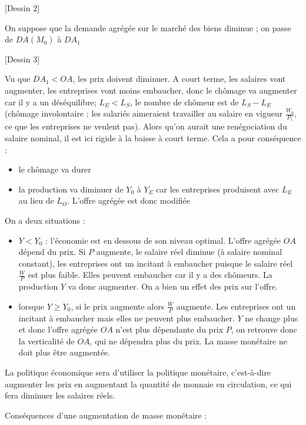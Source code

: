 	[Dessin 2]
	
	On suppose que la demande agrégée sur le marché des biens diminue ; on passe de $DA(M_0)$ à $DA_1$
	
	[Dessin 3]
	
	Vu que $DA_1 < OA$, les prix doivent diminuer. A court terme, les salaires vont augmenter, les entreprises vont moins embaucher, donc le chômage va augmenter car il y a un déséquilibre; $L_E < L_S$, le nombre de chômeur est de $L_S - L_E$ (chômage involontaire ; les salariés aimeraient travailler au salaire en vigueur $\frac{W_0}{P_1}$, ce que les entreprises ne veulent pas). Alors qu'on aurait une renégociation du salaire nominal, il est ici rigide à la baisse à court terme. Cela a pour conséquence :
	
	\begin{itemize}
		\item le chômage va durer
		\item la production va diminuer de $Y_0$ à $Y_E$ car les entreprises produisent avec $L_E$ au lieu de $L_O$. L'offre agrégée est donc modifiée
	\end{itemize}
	
	On a deux situations :
	
	\begin{itemize}
		\item $Y < Y_0$ : l'économie est en dessous de son niveau optimal. L'offre agrégée $OA$ dépend du prix. Si $P$ augmente, le salaire réel diminue (à salaire nominal constant), les entreprises ont un incitant à embaucher puisque le salaire réel $\frac{W}{P}$ est plus faible. Elles peuvent embaucher car il y a des chômeurs. La production $Y$ va donc augmenter. On a bien un effet des prix sur l'offre.
		\item lorsque $Y \geq Y_0$, si le prix augmente alors $\frac{W}{P}$ augmente. Les entreprises ont un incitant à embaucher mais elles ne peuvent plus embaucher. $Y$ ne change plus et donc l'offre agrégée $OA$ n'est plus dépendante du prix $P$, on retrouve donc la verticalité de $OA$, qui ne dépendra plus du prix. La masse monétaire ne doit plus être augmentée.
	\end{itemize}
	
	La politique économique sera d'utiliser la politique monétaire, c'est-à-dire augmenter les prix en augmentant la quantité de monnaie en circulation, ce qui fera diminuer les salaires réels.
	
	Conséquences d'une augmentation de masse monétaire :
	
